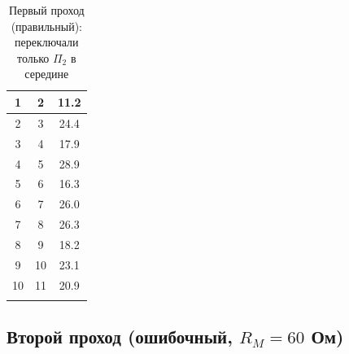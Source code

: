 \documentclass[a4paper]{article}
\begin{document}
\begin{longtable}{|c|c|c|}
		1 & 2 & 11.2 \\ \hline
		2 & 3 & 24.4 \\ \hline
		3 & 4 & 17.9 \\ \hline
		4 & 5 & 28.9 \\ \hline
		5 & 6 & 16.3 \\ \hline
		6 & 7 & 26.0 \\ \hline
		7 & 8 & 26.3 \\ \hline
		8 & 9 & 18.2 \\ \hline
		9 & 10 & 23.1 \\ \hline
		10 & 11 & 20.9 \\ \hline
		\caption{Первый проход (правильный): переключали только $\Pi_2$ в середине}
		\label{tab:first_attempt}
	\end{longtable}
	
	\subsection{Второй проход (ошибочный, $R_M = 60$ Ом)}
	
\end{document}
